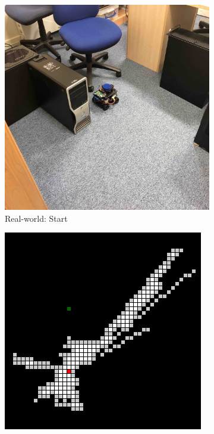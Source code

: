 \begin{figure}[h!]
  \centering
  \begin{subfigure}[b]{0.32\linewidth}
    \includegraphics[width=\linewidth]{images/real/robo/start_2.JPG}
     \caption{Real-world: Start}
  \end{subfigure}
  \hfill
  \begin{subfigure}[b]{0.32\linewidth}
    \includegraphics[width=\linewidth]{images/real/sys/start_2.png}

\end{subfigure}
\end{figure}
